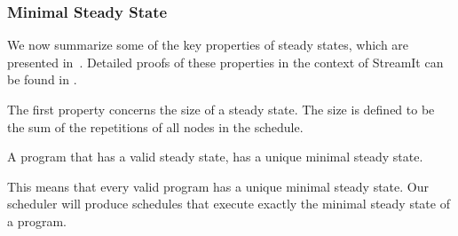 \subsubsection{Minimal Steady State}

We now summarize some of the key properties of steady states, which
are presented in~\cite{lee87static}.  Detailed proofs of these
properties in the context of StreamIt can be found in
\cite{karczma-thesis}.




The first property concerns the size of a steady state.  The size is
defined to be the sum of the repetitions of all nodes in the schedule.

\begin{theorem}
A {\StreamIt} program that has a valid steady state, has a unique
minimal steady state.
\end{theorem}

This means that every valid {\StreamIt} program has a unique minimal
steady state. Our scheduler will produce schedules that execute
exactly the minimal steady state of a program.

